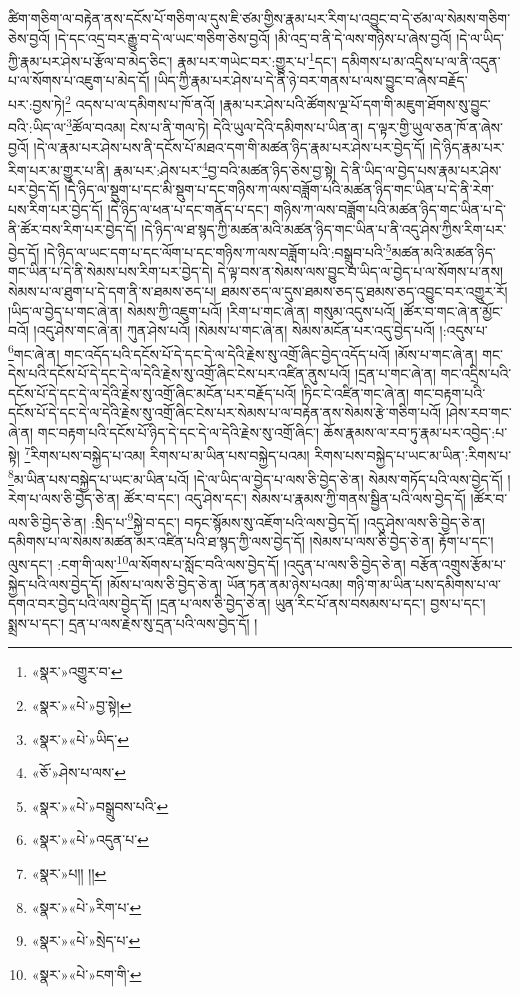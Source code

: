 ཚིག་གཅིག་ལ་བརྟེན་ནས་དངོས་པོ་གཅིག་ལ་དུས་ཇི་ཙམ་གྱིས་རྣམ་པར་རིག་པ་འབྱུང་བ་དེ་ཙམ་ལ་སེམས་གཅིག་ཅེས་བྱའོ། །དེ་དང་འདྲ་བར་རྒྱུ་བ་དེ་ལ་ཡང་གཅིག་ཅེས་བྱའོ། །མི་འདྲ་བ་ནི་དེ་ལས་གཉིས་པ་ཞེས་བྱའོ། །དེ་ལ་ཡིད་ཀྱི་རྣམ་པར་ཤེས་པ་རྩོལ་བ་མེད་ཅིང་། རྣམ་པར་གཡེང་བར་:གྱུར་པ་\footnote{«སྣར་»འགྱུར་བ་}དང་། དམིགས་པ་མ་འདྲིས་པ་ལ་ནི་འདུན་པ་ལ་སོགས་པ་འཇུག་པ་མེད་དོ། །ཡིད་ཀྱི་རྣམ་པར་ཤེས་པ་དེ་ནི་ཉེ་བར་གནས་པ་ལས་བྱུང་བ་ཞེས་བརྗོད་པར་:བྱས་ཏེ།\footnote{«སྣར་»«པེ་»བྱ་སྟེ།} འདས་པ་ལ་དམིགས་པ་ཁོ་ནའོ། །རྣམ་པར་ཤེས་པའི་ཚོགས་ལྔ་པོ་དག་གི་མཇུག་ཐོགས་སུ་བྱུང་བའི་:ཡིད་ལ་\footnote{«སྣར་»«པེ་»ཡིད་}ཚོལ་བའམ། ངེས་པ་ནི་གལ་ཏེ། དེའི་ཡུལ་དེའི་དམིགས་པ་ཡིན་ན། ད་ལྟར་གྱི་ཡུལ་ཅན་ཁོ་ན་ཞེས་བྱའོ། །དེ་ལ་རྣམ་པར་ཤེས་པས་ནི་དངོས་པོ་མཐའ་དག་གི་མཚན་ཉིད་རྣམ་པར་ཤེས་པར་བྱེད་དོ། །དེ་ཉིད་རྣམ་པར་རིག་པར་མ་གྱུར་པ་ནི། རྣམ་པར་:ཤེས་པར་\footnote{«ཅོ་»ཤེས་པ་ལས་}བྱ་བའི་མཚན་ཉིད་ཅེས་བྱ་སྟེ། དེ་ནི་ཡིད་ལ་བྱེད་པས་རྣམ་པར་ཤེས་པར་བྱེད་དོ། །དེ་ཉིད་ལ་སྡུག་པ་དང་མི་སྡུག་པ་དང་གཉིས་ཀ་ལས་བཟློག་པའི་མཚན་ཉིད་གང་ཡིན་པ་དེ་ནི་རེག་པས་རིག་པར་བྱེད་དོ། །དེ་ཉིད་ལ་ཕན་པ་དང་གནོད་པ་དང་། གཉིས་ཀ་ལས་བཟློག་པའི་མཚན་ཉིད་གང་ཡིན་པ་དེ་ནི་ཚོར་བས་རིག་པར་བྱེད་དོ། །དེ་ཉིད་ལ་ཐ་སྙད་ཀྱི་མཚན་མའི་མཚན་ཉིད་གང་ཡིན་པ་ནི་འདུ་ཤེས་ཀྱིས་རིག་པར་བྱེད་དོ། །དེ་ཉིད་ལ་ཡང་དག་པ་དང་ལོག་པ་དང་གཉིས་ཀ་ལས་བཟློག་པའི་:བསྒྲུབ་པའི་\footnote{«སྣར་»«པེ་»བསྒྲུབས་པའི་}མཚན་མའི་མཚན་ཉིད་གང་ཡིན་པ་དེ་ནི་སེམས་པས་རིག་པར་བྱེད་དེ། དེ་ལྟ་བས་ན་སེམས་ལས་བྱུང་བ་ཡིད་ལ་བྱེད་པ་ལ་སོགས་པ་ནས། སེམས་པ་ལ་ཐུག་པ་དེ་དག་ནི་ས་ཐམས་ཅད་པ། ཐམས་ཅད་ལ་དུས་ཐམས་ཅད་དུ་ཐམས་ཅད་འབྱུང་བར་འགྱུར་རོ། །ཡིད་ལ་བྱེད་པ་གང་ཞེ་ན། སེམས་ཀྱི་འཇུག་པའོ། །རིག་པ་གང་ཞེ་ན། གསུམ་འདུས་པའོ། །ཚོར་བ་གང་ཞེ་ན་མྱོང་བའོ། །འདུ་ཤེས་གང་ཞེ་ན། ཀུན་ཤེས་པའོ། །སེམས་པ་གང་ཞེ་ན། སེམས་མངོན་པར་འདུ་བྱེད་པའོ། །:འདུས་པ་\footnote{«སྣར་»«པེ་»འདུན་པ་}གང་ཞེ་ན། གང་འདོད་པའི་དངོས་པོ་དེ་དང་དེ་ལ་དེའི་རྗེས་སུ་འགྲོ་ཞིང་བྱེད་འདོད་པའོ། །མོས་པ་གང་ཞེ་ན། གང་དེས་པའི་དངོས་པོ་དེ་དང་དེ་ལ་དེའི་རྗེས་སུ་འགྲོ་ཞིང་ངེས་པར་འཛིན་ནུས་པའོ། །དྲན་པ་གང་ཞེ་ན། གང་འདྲིས་པའི་དངོས་པོ་དེ་དང་དེ་ལ་དེའི་རྗེས་སུ་འགྲོ་ཞིང་མངོན་པར་བརྗོད་པའོ། །ཏིང་ངེ་འཛིན་གང་ཞེ་ན། གང་བརྟག་པའི་དངོས་པོ་དེ་དང་དེ་ལ་དེའི་རྗེས་སུ་འགྲོ་ཞིང་ངེས་པར་སེམས་པ་ལ་བརྟེན་ནས་སེམས་རྩེ་གཅིག་པའོ། །ཤེས་རབ་གང་ཞེ་ན། གང་བརྟག་པའི་དངོས་པོ་ཉིད་དེ་དང་དེ་ལ་དེའི་རྗེས་སུ་འགྲོ་ཞིང་། ཆོས་རྣམས་ལ་རབ་ཏུ་རྣམ་པར་འབྱེད་:པ་སྟེ། \footnote{«སྣར་»པ།། །། }རིགས་པས་བསྐྱེད་པ་འམ། རིགས་པ་མ་ཡིན་པས་བསྐྱེད་པའམ། རིགས་པས་བསྐྱེད་པ་ཡང་མ་ཡིན་:རིགས་པ་\footnote{«སྣར་»«པེ་»རིག་པ་}མ་ཡིན་པས་བསྐྱེད་པ་ཡང་མ་ཡིན་པའོ། །དེ་ལ་ཡིད་ལ་བྱེད་པ་ལས་ཅི་བྱེད་ཅེ་ན། སེམས་གཏོད་པའི་ལས་བྱེད་དོ། །རེག་པ་ལས་ཅི་བྱེད་ཅེ་ན། ཚོར་བ་དང་། འདུ་ཤེས་དང་། སེམས་པ་རྣམས་ཀྱི་གནས་སྦྱིན་པའི་ལས་བྱེད་དོ། །ཚོར་བ་ལས་ཅི་བྱེད་ཅེ་ན། :སྲིད་པ་\footnote{«སྣར་»«པེ་»སྲེད་པ་}སྐྱེ་བ་དང་། བཏང་སྙོམས་སུ་འཇོག་པའི་ལས་བྱེད་དོ། །འདུ་ཤེས་ལས་ཅི་བྱེད་ཅེ་ན། དམིགས་པ་ལ་སེམས་མཚན་མར་འཛིན་པའི་ཐ་སྙད་ཀྱི་ལས་བྱེད་དོ། །སེམས་པ་ལས་ཅི་བྱེད་ཅེ་ན། རྟོག་པ་དང་། ལུས་དང་། :ངག་གི་ལས་\footnote{«སྣར་»«པེ་»ངག་གི་}ལ་སོགས་པ་སློང་བའི་ལས་བྱེད་དོ། །འདུན་པ་ལས་ཅི་བྱེད་ཅེ་ན། བརྩོན་འགྲུས་རྩོམ་པ་སྐྱེད་པའི་ལས་བྱེད་དོ། །མོས་པ་ལས་ཅི་བྱེད་ཅེ་ན། ཡོན་ཏན་ནམ་ཉེས་པའམ། གཉི་ག་མ་ཡིན་པས་དམིགས་པ་ལ་དགའ་བར་བྱེད་པའི་ལས་བྱེད་དོ། །དྲན་པ་ལས་ཅི་བྱེད་ཅེ་ན། ཡུན་རིང་པོ་ནས་བསམས་པ་དང་། བྱས་པ་དང་། སྨྲས་པ་དང་། དྲན་པ་ལས་རྗེས་སུ་དྲན་པའི་ལས་བྱེད་དོ། །
